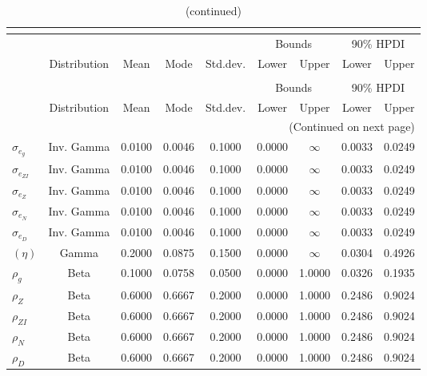  
\begin{center}
\begin{longtable}{lcccccccc} 
\caption{Prior information (parameters)}\\
 \label{Table:Prior}\\
\toprule%
  &  &  &  &  & \multicolumn{2}{c}{Bounds} & \multicolumn{2}{c}{90\% HPDI} \\ 
  \cmidrule(r{.75em}){6-7} \cmidrule(r{.75em}){8-9}
  & Distribution & Mean & Mode & Std.dev. & Lower & Upper & Lower & Upper  \\ 
\midrule
\endfirsthead
\caption{(continued)}\\
 \toprule%
  &  &  &  &  & \multicolumn{2}{c}{Bounds} & \multicolumn{2}{c}{90\% HPDI} \\ 
  \cmidrule(r{.75em}){6-7} \cmidrule(r{.75em}){8-9}
  & Distribution & Mean & Mode & Std.dev. & Lower & Upper & Lower & Upper  \\ 
\midrule
\endhead
\midrule
\multicolumn{9}{r}{(Continued on next page)} \\ 
\bottomrule
\endfoot
\bottomrule
\endlastfoot
$ \sigma_{{e_g}} $ & Inv. Gamma & 0.0100 & 0.0046 & 0.1000 & 0.0000 & $\infty$ & 0.0033 & 0.0249 \\ 
$ \sigma_{{e_{ZI}}} $ & Inv. Gamma & 0.0100 & 0.0046 & 0.1000 & 0.0000 & $\infty$ & 0.0033 & 0.0249 \\ 
$ \sigma_{{e_Z}} $ & Inv. Gamma & 0.0100 & 0.0046 & 0.1000 & 0.0000 & $\infty$ & 0.0033 & 0.0249 \\ 
$ \sigma_{{e_N}} $ & Inv. Gamma & 0.0100 & 0.0046 & 0.1000 & 0.0000 & $\infty$ & 0.0033 & 0.0249 \\ 
$ \sigma_{{e_D}} $ & Inv. Gamma & 0.0100 & 0.0046 & 0.1000 & 0.0000 & $\infty$ & 0.0033 & 0.0249 \\ 
$ (\eta) $ & Gamma & 0.2000 & 0.0875 & 0.1500 & 0.0000 & $\infty$ & 0.0304 & 0.4926 \\ 
$ {\rho_g} $ & Beta & 0.1000 & 0.0758 & 0.0500 & 0.0000 & 1.0000 & 0.0326 & 0.1935 \\ 
$ {\rho_Z} $ & Beta & 0.6000 & 0.6667 & 0.2000 & 0.0000 & 1.0000 & 0.2486 & 0.9024 \\ 
$ {\rho_{ZI}} $ & Beta & 0.6000 & 0.6667 & 0.2000 & 0.0000 & 1.0000 & 0.2486 & 0.9024 \\ 
$ {\rho_N} $ & Beta & 0.6000 & 0.6667 & 0.2000 & 0.0000 & 1.0000 & 0.2486 & 0.9024 \\ 
$ {\rho_D} $ & Beta & 0.6000 & 0.6667 & 0.2000 & 0.0000 & 1.0000 & 0.2486 & 0.9024 \\ 
\end{longtable}
 \end{center}

